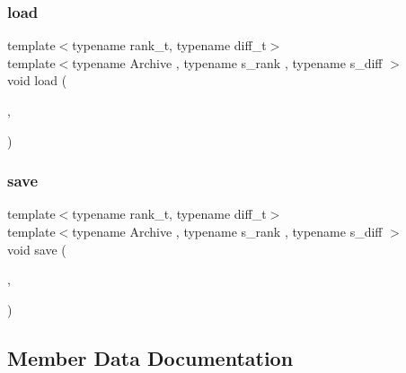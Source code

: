 \subsubsection{\texorpdfstring{load}{load}}
{\footnotesize\ttfamily template$<$typename rank\+\_\+t, typename diff\+\_\+t$>$ \\
template$<$typename Archive , typename s\+\_\+rank , typename s\+\_\+diff $>$ \\
void load (\begin{DoxyParamCaption}\item[{Archive \&}]{,  }\item[{\hyperlink{classMackey_1_1MultiplicationTable}{Multiplication\+Table}$<$ s\+\_\+rank, s\+\_\+diff $>$ \&}]{ }\end{DoxyParamCaption})\hspace{0.3cm}{\ttfamily [friend]}}

\mbox{\label{classMackey_1_1MultiplicationTable_ab6423e67b6c7d46e94ebf021316713d6}} 
\subsubsection{\texorpdfstring{save}{save}}
{\footnotesize\ttfamily template$<$typename rank\+\_\+t, typename diff\+\_\+t$>$ \\
template$<$typename Archive , typename s\+\_\+rank , typename s\+\_\+diff $>$ \\
void save (\begin{DoxyParamCaption}\item[{Archive \&}]{,  }\item[{const \hyperlink{classMackey_1_1MultiplicationTable}{Multiplication\+Table}$<$ s\+\_\+rank, s\+\_\+diff $>$ \&}]{ }\end{DoxyParamCaption})\hspace{0.3cm}{\ttfamily [friend]}}



\subsection{Member Data Documentation}
\mbox{\label{classMackey_1_1MultiplicationTable_ac5749155e5531a3c728d8227caed63eb}} 

